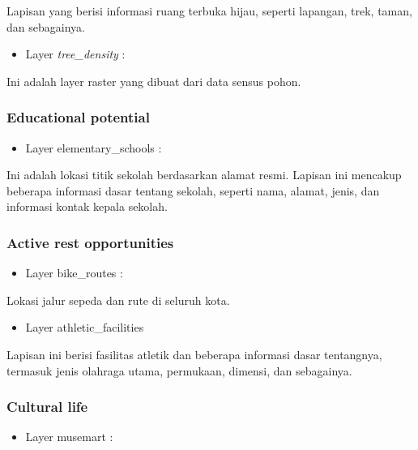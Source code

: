 \documentclass[]{book}
\providecommand{\tightlist}{%
  \setlength{\itemsep}{0pt}\setlength{\parskip}{0pt}}
\begin{document}
Lapisan yang berisi informasi ruang terbuka hijau, seperti lapangan, trek, taman, dan sebagainya.

\begin{itemize}
\tightlist
\item
  Layer \emph{tree\_density} :
\end{itemize}

Ini adalah layer raster yang dibuat dari data sensus pohon.

\hypertarget{educational-potential}{%
\subsubsection{Educational potential}\label{educational-potential}}

\begin{itemize}
\tightlist
\item
  Layer elementary\_schools :
\end{itemize}

Ini adalah lokasi titik sekolah berdasarkan alamat resmi. Lapisan ini mencakup beberapa informasi dasar tentang sekolah, seperti nama, alamat, jenis, dan informasi kontak kepala sekolah.

\hypertarget{active-rest-opportunities}{%
\subsubsection{Active rest opportunities}\label{active-rest-opportunities}}

\begin{itemize}
\tightlist
\item
  Layer bike\_routes :
\end{itemize}

Lokasi jalur sepeda dan rute di seluruh kota.

\begin{itemize}
\tightlist
\item
  Layer athletic\_facilities
\end{itemize}

Lapisan ini berisi fasilitas atletik dan beberapa informasi dasar tentangnya, termasuk jenis olahraga utama, permukaan, dimensi, dan sebagainya.

\hypertarget{cultural-life}{%
\subsubsection{Cultural life}\label{cultural-life}}

\begin{itemize}
\tightlist
\item
  Layer musemart :
\end{itemize}
\end{document}

